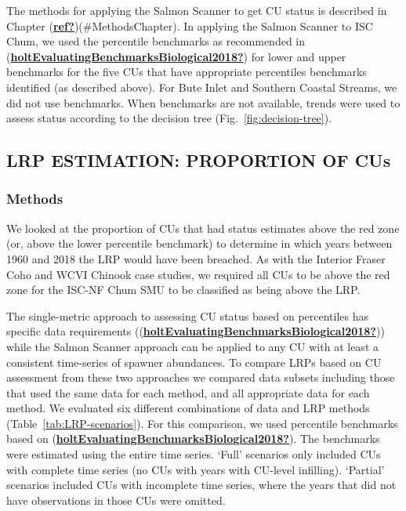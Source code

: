 \documentclass[11pt]{book}
\begin{document}
The methods for applying the Salmon Scanner to get CU status is described in Chapter (\protect\hyperlink{ref-ref}{\textbf{ref?}})(\#MethodsChapter). In applying the Salmon Scanner to ISC Chum, we used the percentile benchmarks as recommended in (\protect\hyperlink{ref-holtEvaluatingBenchmarksBiological2018}{\textbf{holtEvaluatingBenchmarksBiological2018?}}) for lower and upper benchmarks for the five CUs that have appropriate percentiles benchmarks identified (as described above). For Bute Inlet and Southern Coastal Streams, we did not use benchmarks. When benchmarks are not available, trends were used to assess status according to the decision tree (Fig.~\ref{fig:decision-tree}).

\hypertarget{lrp-estimation-proportion-of-cus-1}{%
\subsection{LRP ESTIMATION: PROPORTION OF CUs}\label{lrp-estimation-proportion-of-cus-1}}

\hypertarget{methods-4}{%
\subsubsection{Methods}\label{methods-4}}

We looked at the proportion of CUs that had status estimates above the red zone (or, above the lower percentile benchmark) to determine in which years between 1960 and 2018 the LRP would have been breached. As with the Interior Fraser Coho and WCVI Chinook case studies, we required all CUs to be above the red zone for the ISC-NF Chum SMU to be classified as being above the LRP.

The single-metric approach to assessing CU status based on percentiles has specific data requirements ((\protect\hyperlink{ref-holtEvaluatingBenchmarksBiological2018}{\textbf{holtEvaluatingBenchmarksBiological2018?}})) while the Salmon Scanner approach can be applied to any CU with at least a consistent time-series of spawner abundances. To compare LRPs based on CU assessment from these two approaches we compared data subsets including those that used the same data for each method, and all appropriate data for each method. We evaluated six different combinations of data and LRP methods (Table~\ref{tab:LRP-scenarios}). For this comparison, we used percentile benchmarks based on (\protect\hyperlink{ref-holtEvaluatingBenchmarksBiological2018}{\textbf{holtEvaluatingBenchmarksBiological2018?}}). The benchmarks were estimated using the entire time series. `Full' scenarios only included CUs with complete time series (no CUs with years with CU-level infilling). `Partial' scenarios included CUs with incomplete time series, where the years that did not have observations in those CUs were omitted.
\end{document}
